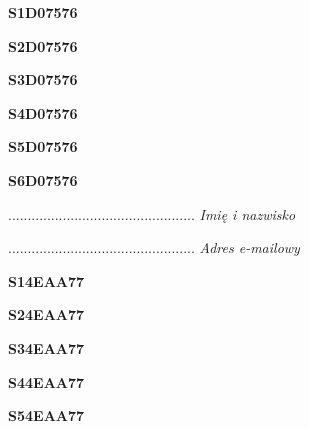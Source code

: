 \begin{turn}{90}\huge \textbf{S1D07576}\end{turn}

\begin{turn}{90}\huge \textbf{S2D07576}\end{turn}

\begin{turn}{90}\huge \textbf{S3D07576}\end{turn}

\begin{turn}{90}\huge \textbf{S4D07576}\end{turn}

\begin{turn}{90}\huge \textbf{S5D07576}\end{turn}

\begin{turn}{90}\huge \textbf{S6D07576}\end{turn}

\begin{turn}{90}\begin{minipage}{\linewidth} \vspace{20mm} ................................................  \textit{Imię i nazwisko}\end{minipage}\end{turn}

\begin{turn}{90}\begin{minipage}{\linewidth} \vspace{20mm} ................................................  \textit{Adres e-mailowy}\end{minipage}\end{turn}

\begin{turn}{90}\huge \textbf{S14EAA77}\end{turn}

\begin{turn}{90}\huge \textbf{S24EAA77}\end{turn}

\begin{turn}{90}\huge \textbf{S34EAA77}\end{turn}

\begin{turn}{90}\huge \textbf{S44EAA77}\end{turn}

\begin{turn}{90}\huge \textbf{S54EAA77}\end{turn}

